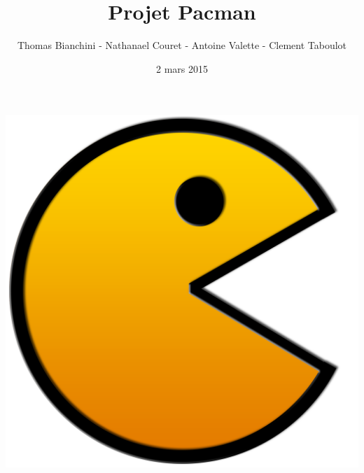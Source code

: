 \documentclass{article}
\author{Thomas Bianchini - Nathanael Couret - Antoine Valette - Clement Taboulot}
\title{Projet Pacman}
\date{2 mars 2015}
\begin{document}
\maketitle

\centerline{\includegraphics[scale=0.3]{pics/Pacman_HD}}

\pagebreak

\tableofcontents

\pagebreak






\end{document}
